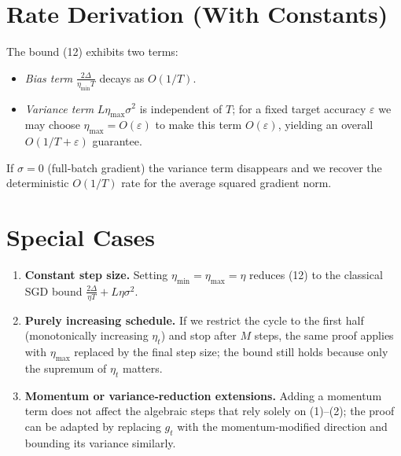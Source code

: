 \documentclass{article}
\begin{document}
\section*{Rate Derivation (With Constants)}
The bound (12) exhibits two terms:
\begin{itemize}
\item \emph{Bias term} $\displaystyle \frac{2\Delta}{\eta_{\min}T}$ decays as $O(1/T)$.
\item \emph{Variance term} $\displaystyle L\eta_{\max}\sigma^{2}$ is independent of $T$; for a fixed target accuracy $\varepsilon$ we may choose $\eta_{\max}=O(\varepsilon)$ to make this term $O(\varepsilon)$, yielding an overall $O(1/T+\varepsilon)$ guarantee.
\end{itemize}
If $\sigma=0$ (full‑batch gradient) the variance term disappears and we recover the deterministic $O(1/T)$ rate for the average squared gradient norm.

\section*{Special Cases}
\begin{enumerate}[label=(\alph*)]
\item \textbf{Constant step size.} Setting $\eta_{\min}=\eta_{\max}=\eta$ reduces (12) to the classical SGD bound $\frac{2\Delta}{\eta T}+L\eta\sigma^{2}$.
\item \textbf{Purely increasing schedule.} If we restrict the cycle to the first half (monotonically increasing $\eta_t$) and stop after $M$ steps, the same proof applies with $\eta_{\max}$ replaced by the final step size; the bound still holds because only the supremum of $\eta_t$ matters.
\item \textbf{Momentum or variance‑reduction extensions.} Adding a momentum term does not affect the algebraic steps that rely solely on (1)–(2); the proof can be adapted by replacing $g_t$ with the momentum‑modified direction and bounding its variance similarly.
\end{enumerate}
\end{document}
